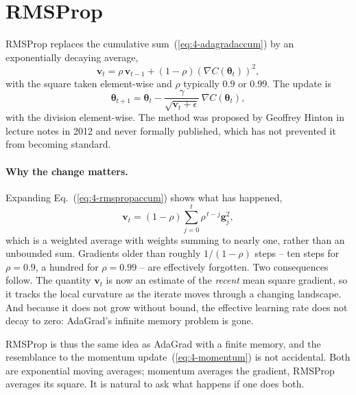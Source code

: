 \section{RMSProp}
\label{sec:rmsprop}

RMSProp replaces the cumulative sum~(\ref{eq:4-adagradaccum}) by an
exponentially decaying average,
\begin{equation}
  \bm{v}_t = \rho\,\bm{v}_{t-1} + (1-\rho)\left(\nabla C(\bm{\theta}_t)\right)^{2},
  \label{eq:4-rmspropaccum}
\end{equation}
with the square taken element-wise and $\rho$ typically $0.9$ or $0.99$.  The
update is
\begin{equation}
  \boxed{\;
  \bm{\theta}_{t+1} = \bm{\theta}_t
    - \frac{\gamma}{\sqrt{\bm{v}_t+\epsilon}}\,\nabla C(\bm{\theta}_t) , \;}
  \label{eq:4-rmsprop}
\end{equation}
with the division element-wise.  The method was proposed by Geoffrey Hinton in
lecture notes in 2012 and never formally published, which has not prevented it
from becoming standard.

\paragraph{Why the change matters.}
Expanding Eq.~(\ref{eq:4-rmspropaccum}) shows what has happened,
\begin{equation}
  \bm{v}_t = (1-\rho)\sum_{j=0}^{t}\rho^{\,t-j}\bm{g}_j^{2},
  \label{eq:4-rmspropsum}
\end{equation}
which is a weighted average with weights summing to nearly one, rather than an
unbounded sum.  Gradients older than roughly $1/(1-\rho)$ steps -- ten steps
for $\rho=0.9$, a hundred for $\rho=0.99$ -- are effectively forgotten.  Two
consequences follow.  The quantity $\bm{v}_t$ is now an estimate of the
\emph{recent} mean square gradient, so it tracks the local curvature as the
iterate moves through a changing landscape.  And because it does not grow
without bound, the effective learning rate does not decay to zero: AdaGrad's
infinite memory problem is gone.

RMSProp is thus the same idea as AdaGrad with a finite memory, and the
resemblance to the momentum update~(\ref{eq:4-momentum}) is not accidental.
Both are exponential moving averages; momentum averages the gradient, RMSProp
averages its square.  It is natural to ask what happens if one does both.

